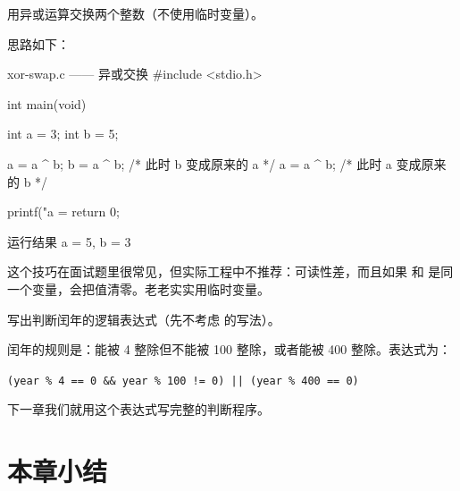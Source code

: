 \begin{example}
用异或运算交换两个整数（不使用临时变量）。
\end{example}
\begin{solution}
思路如下：

\begin{codebox}{xor-swap.c —— 异或交换}
#include <stdio.h>

int main(void)
{
    int a = 3;
    int b = 5;

    a = a ^ b;
    b = a ^ b;      /* 此时 b 变成原来的 a */
    a = a ^ b;      /* 此时 a 变成原来的 b */

    printf("a = %
    return 0;
}
\end{codebox}

\begin{outbox}{运行结果}
a = 5, b = 3
\end{outbox}

\begin{pitfall}[异或交换只适合炫技]
这个技巧在面试题里很常见，但实际工程中不推荐：可读性差，而且如果  和  是同一个变量，会把值清零。老老实实用临时变量。
\end{pitfall}
\end{solution}

\begin{example}
写出判断闰年的逻辑表达式（先不考虑  的写法）。
\end{example}
\begin{solution}
闰年的规则是：能被 4 整除但不能被 100 整除，或者能被 400 整除。表达式为：

\begin{center}
\texttt{(year \% 4 == 0 \&\& year \% 100 != 0) || (year \% 400 == 0)}
\end{center}

下一章我们就用这个表达式写完整的判断程序。
\end{solution}

\section{本章小结}

